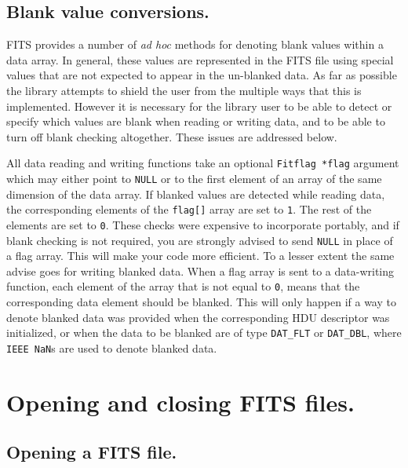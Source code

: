 \label{blanking}\subsection{Blank value conversions.}

FITS provides a number of {\it ad hoc} methods for denoting blank values
within a data array. In general, these values are represented in the
FITS file using special values that are not expected to appear in the
un-blanked data. As far as possible the library attempts to shield the
user from the multiple ways that this is implemented. However it is
necessary for the library user to be able to detect or specify which
values are blank when reading or writing data, and to be able to turn
off blank checking altogether. These issues are addressed below.

All data reading and writing functions take an optional \verb`Fitflag *flag`
argument which may either point to \verb`NULL` or to the first element
of an array of the same dimension of the data array. If blanked values
are detected while reading data, the corresponding elements of the
\verb`flag[]` array are set to \verb`1`. The rest of the elements are set to
\verb`0`. These checks were expensive to incorporate portably, and if blank
checking is not required, you are strongly advised to send \verb`NULL`
in place of a flag array. This will make your code more efficient. To
a lesser extent the same advise goes for writing blanked data. When a
flag array is sent to a data-writing function, each element of the
array that is not equal to \verb`0`, means that the corresponding data
element should be blanked. This will only happen if a way to denote
blanked data was provided when the corresponding HDU descriptor was
initialized, or when the data to be blanked are of type \verb`DAT_FLT`
or \verb`DAT_DBL`, where \verb`IEEE NaN`s are used to denote blanked data.


\section{Opening and closing FITS files.}

\subsection{Opening a FITS file.}

